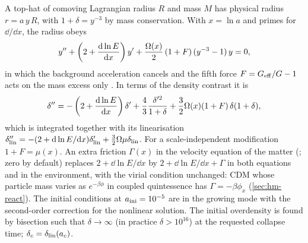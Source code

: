 A top-hat of comoving Lagrangian radius $R$ and mass $M$ has physical radius $r=a\,y\,R$, with $1+\delta=y^{-3}$ by mass
conservation. With $x=\ln a$ and primes for $\dd/\dd x$, the radius obeys
\begin{equation}
y''+\left(2+\frac{\mathrm{d}\ln E}{\mathrm{d} x}\right)y'+\frac{\Omega(x)}{2}\,(1+F)\,(y^{-3}-1)\,y=0,
\end{equation}
in which the background acceleration cancels and the fifth force $F=G_{\rm eff}/G-1$ acts on the mass excess only
\cite{Schmidt2010,Lombriser2014,Cataneo2019}. In terms of the density contrast it is
\begin{equation}\label{eq:sc-delta}
\delta''=-\left(2+\frac{\mathrm{d}\ln E}{\mathrm{d} x}\right)\delta'+\frac43\frac{\delta'^2}{1+\delta}+\frac32\Omega(x)(1+F)\,\delta(1+\delta),
\end{equation}
which is integrated together with its linearisation $\delta_{\rm lin}''=-(2+\mathrm{d}\ln E/\mathrm{d} x)\delta_{\rm lin}'+\frac32\Omega\mu\delta_{\rm lin}$.
For a scale-independent modification $1+F=\mu(x)$. An extra friction $\Gamma(x)$ in the velocity equation of the matter
(; zero by default) replaces $2+\dd\ln E/\dd x$ by $2+\dd\ln E/\dd x+\Gamma$ in both
equations and in the environment, with the virial condition unchanged: CDM whose particle mass varies as $e^{-\beta\phi}$ in
coupled quintessence has $\Gamma=-\beta\phi_x$ (\cref{sec:hm-react}). The initial conditions at $a_{\rm ini}=10^{-5}$ are in the growing
mode with the second-order correction for the nonlinear solution. The initial overdensity is found by bisection such that
$\delta\to\infty$ (in practice $\delta>10^{16}$) at the requested collapse time; $\delta_c=\delta_{\rm lin}(a_c)$.

